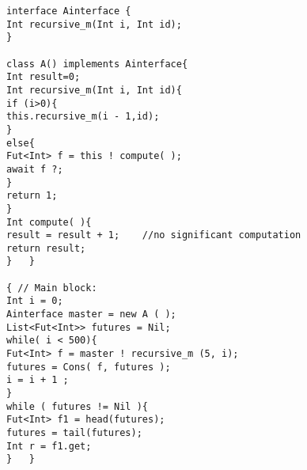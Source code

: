 %
\begin{lstlisting}[caption= Benchmark Example, label=absex]
interface Ainterface {
Int recursive_m(Int i, Int id);
}

class A() implements Ainterface{
Int result=0;
Int recursive_m(Int i, Int id){
if (i>0){
this.recursive_m(i - 1,id);	
}
else{
Fut<Int> f = this ! compute( );
await f ?;
}
return 1;
}
Int compute( ){
result = result + 1;	//no significant computation
return result;
}	}

{ // Main block:
Int i = 0;	
Ainterface master = new A ( );
List<Fut<Int>> futures = Nil;	
while( i < 500){		
Fut<Int> f = master ! recursive_m (5, i);
futures = Cons( f, futures );
i = i + 1 ;
}
while ( futures != Nil ){
Fut<Int> f1 = head(futures);
futures = tail(futures);
Int r = f1.get;
}	}
\end{lstlisting}



